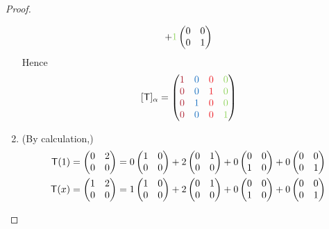 \begin{proof}
\begin{enumerate}
\begin{align*}
        + \GREEN{1} \begin{pmatrix} 0 & 0 \\ 0 & 1 \end{pmatrix} \\
\end{align*}
Hence
\[
    [\T]_{\alpha}
    = \begin{pmatrix}
        \MAROON{1} & \BLUE{0} & \RED{0} & \GREEN{0} \\
        \MAROON{0} & \BLUE{0} & \RED{1} & \GREEN{0} \\
        \MAROON{0} & \BLUE{1} & \RED{0} & \GREEN{0} \\
        \MAROON{0} & \BLUE{0} & \RED{0} & \GREEN{1}
    \end{pmatrix}
\]

\item (By calculation,)
\begin{align*}
    \T(1) = \begin{pmatrix} 0 & 2 \\ 0 & 0 \end{pmatrix}
          = 0 \begin{pmatrix} 1 & 0 \\ 0 & 0 \end{pmatrix}
          + 2 \begin{pmatrix} 0 & 1 \\ 0 & 0 \end{pmatrix}
          + 0 \begin{pmatrix} 0 & 0 \\ 1 & 0 \end{pmatrix}
          + 0 \begin{pmatrix} 0 & 0 \\ 0 & 1 \end{pmatrix} \\
    \T(x) = \begin{pmatrix} 1 & 2 \\ 0 & 0 \end{pmatrix}
          = 1 \begin{pmatrix} 1 & 0 \\ 0 & 0 \end{pmatrix}
          + 2 \begin{pmatrix} 0 & 1 \\ 0 & 0 \end{pmatrix}
          + 0 \begin{pmatrix} 0 & 0 \\ 1 & 0 \end{pmatrix}
          + 0 \begin{pmatrix} 0 & 0 \\ 0 & 1 \end{pmatrix} \\

\end{align*}
\end{enumerate}
\end{proof}
